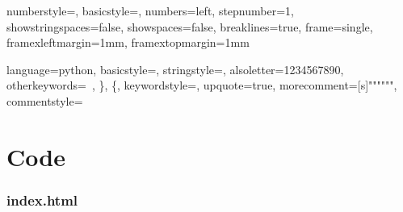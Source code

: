 \lstset
{
	numberstyle=\footnotesize,
	basicstyle=\ttfamily\footnotesize,
	numbers=left,
	stepnumber=1,
	showstringspaces=false,
	showspaces=false,
	breaklines=true,
	frame=single,
	framexleftmargin=1mm,
	framextopmargin=1mm
}


\lstset
{
	language=python,
	basicstyle=\ttfamily\footnotesize,
	stringstyle=\color{red},
	alsoletter={1234567890},
	otherkeywords={\ , \}, \{},
	keywordstyle=\color{blue},
	upquote=true,
	morecomment=[s]{"""}{"""},
	commentstyle=\color{gray}\slshape
}

\part{Code}
	\setcounter{chapter}{0}
	
	
	
	
	
	
	
	\section{index.html}
	
	
	
